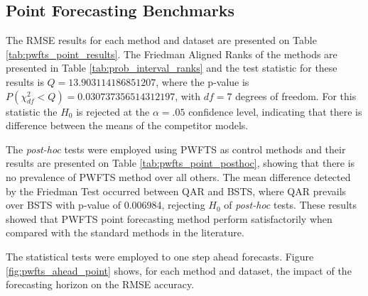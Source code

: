 \subsection{Point Forecasting Benchmarks}
\label{sec:pwfts_experiments_point}

The RMSE results for each method and dataset are presented on Table \ref{tab:pwfts_point_results}. The Friedman Aligned Ranks of the methods are presented in Table \ref{tab:prob_interval_ranks} and the test statistic for these results is $Q = 13.903114186851207$, where the p-value is $P(\chi^2_{df} < Q) = 0.030737356514312197$, with $df=7$ degrees of freedom. For this statistic the $H_0$ is rejected at the $\alpha=.05$ confidence level, indicating that there is difference between the means of the competitor models.

The \textit{post-hoc} tests were employed using PWFTS as control methods and their results are presented on Table \ref{tab:pwfts_point_posthoc}, showing that there is no prevalence of PWFTS method over all others. The mean difference detected by the Friedman Test occurred between QAR and BSTS, where QAR prevails over BSTS with p-value of 0.006984, rejecting $H_0$ of \textit{post-hoc} tests. These results showed that PWFTS point forecasting method perform satisfactorily when compared with the standard methods in the literature. 

The statistical tests were employed to one step ahead forecasts. Figure \ref{fig:pwfts_ahead_point} shows, for each method and dataset, the impact of the forecasting horizon on the RMSE accuracy.

\begin{table}[ht]
    \caption{RMSE for one step ahead point forecasts}
    \label{tab:pwfts_point_results}
\end{table}

